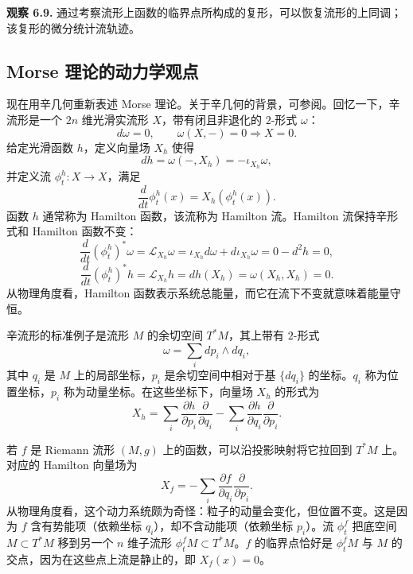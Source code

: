 \begin{note}\label{note:morse-homology-observation}
\textbf{观察 6.9.} 通过考察流形上函数的临界点所构成的复形，可以恢复流形的上同调；该复形的微分统计流轨迹。
\end{note}

\subsection{Morse 理论的动力学观点}\label{subsec:morse-dynamics}
现在用辛几何重新表述 Morse 理论。关于辛几何的背景，可参阅。回忆一下，辛流形是一个 $2n$ 维光滑实流形 $X$，带有闭且非退化的 $2$-形式 $\omega$：
\[
  d\omega=0,\qquad \omega(X,-)=0\Longrightarrow X=0.
\]
给定光滑函数 $h$，定义向量场 $X_h$ 使得
\[
  dh=\omega(-,X_h)=-\iota_{X_h}\omega,
\]
并定义流 $\phi_t^h\colon X\to X$，满足
\[
  \frac{d}{dt}\phi_t^h(x)=X_h(\phi_t^h(x)).
\]
函数 $h$ 通常称为 Hamilton 函数，该流称为 Hamilton 流。Hamilton 流保持辛形式和 Hamilton 函数不变：
\[
  \frac{d}{dt}(\phi_t^h)^*\omega
  =\mathcal L_{X_h}\omega
  =\iota_{X_h}d\omega+d\iota_{X_h}\omega=0-d^2h=0,
\]
\[
  \frac{d}{dt}(\phi_t^h)^*h
  =\mathcal L_{X_h}h=dh(X_h)=\omega(X_h,X_h)=0.
\]
从物理角度看，Hamilton 函数表示系统总能量，而它在流下不变就意味着能量守恒。

辛流形的标准例子是流形 $M$ 的余切空间 $T^*M$，其上带有 $2$-形式
\[
  \omega=\sum_i dp_i\wedge dq_i,
\]
其中 $q_i$ 是 $M$ 上的局部坐标，$p_i$ 是余切空间中相对于基 $\{dq_i\}$ 的坐标。$q_i$ 称为位置坐标，$p_i$ 称为动量坐标。在这些坐标下，向量场 $X_h$ 的形式为
\[
  X_h=\sum_i\frac{\partial h}{\partial p_i}\frac{\partial}{\partial q_i}
       -\sum_i\frac{\partial h}{\partial q_i}\frac{\partial}{\partial p_i}.
\]

若 $f$ 是 Riemann 流形 $(M,g)$ 上的函数，可以沿投影映射将它拉回到 $T^*M$ 上。对应的 Hamilton 向量场为
\[
  X_f=-\sum_i\frac{\partial f}{\partial q_i}\frac{\partial}{\partial p_i}.
\]
从物理角度看，这个动力系统颇为奇怪：粒子的动量会变化，但位置不变。这是因为 $f$ 含有势能项（依赖坐标 $q_i$），却不含动能项（依赖坐标 $p_i$）。流 $\phi_t^f$ 把底空间 $M\subset T^*M$ 移到另一个 $n$ 维子流形 $\phi_t^fM\subset T^*M$。$f$ 的临界点恰好是 $\phi_t^fM$ 与 $M$ 的交点，因为在这些点上流是静止的，即 $X_f(x)=0$。

